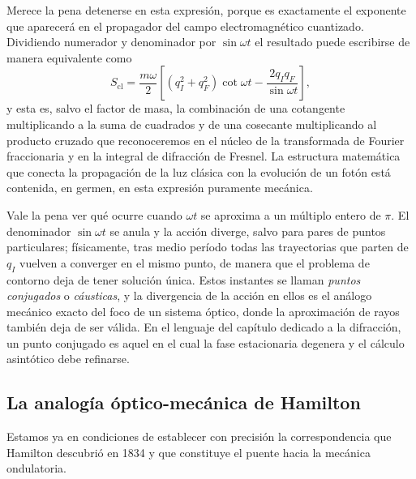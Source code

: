         Merece la pena detenerse en esta expresión, porque es exactamente el exponente que aparecerá en el propagador del campo electromagnético cuantizado. Dividiendo numerador y denominador por $\sin\omega t$ el resultado puede escribirse de manera equivalente como
        \begin{equation}\label{eq:AccionOsciladorCot}
            S_{\mathrm{cl}} = \frac{m\omega}{2}\left[\left(q_{I}^{2}+q_{F}^{2}\right)\cot\omega t - \frac{2q_{I}q_{F}}{\sin\omega t}\right],
        \end{equation}
        y esta es, salvo el factor de masa, la combinación de una cotangente multiplicando a la suma de cuadrados y de una cosecante multiplicando al producto cruzado que reconoceremos en el núcleo de la transformada de Fourier fraccionaria y en la integral de difracción de Fresnel. La estructura matemática que conecta la propagación de la luz clásica con la evolución de un fotón está contenida, en germen, en esta expresión puramente mecánica.

        Vale la pena ver qué ocurre cuando $\omega t$ se aproxima a un múltiplo entero de $\pi$. El denominador $\sin\omega t$ se anula y la acción diverge, salvo para pares de puntos particulares; físicamente, tras medio período todas las trayectorias que parten de $q_{I}$ vuelven a converger en el mismo punto, de manera que el problema de contorno deja de tener solución única. Estos instantes se llaman \textit{puntos conjugados} o \textit{cáusticas}, y la divergencia de la acción en ellos es el análogo mecánico exacto del foco de un sistema óptico, donde la aproximación de rayos también deja de ser válida. En el lenguaje del capítulo dedicado a la difracción, un punto conjugado es aquel en el cual la fase estacionaria degenera y el cálculo asintótico debe refinarse.

    \subsection{La analogía óptico-mecánica de Hamilton}

        Estamos ya en condiciones de establecer con precisión la correspondencia que Hamilton descubrió en 1834 y que constituye el puente hacia la mecánica ondulatoria.


